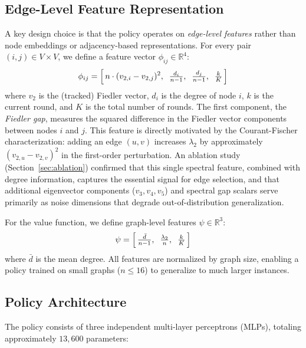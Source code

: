 \documentclass{article}
\begin{document}
\subsection{Edge-Level Feature Representation}

A key design choice is that the policy operates on \emph{edge-level features} rather than node embeddings or adjacency-based representations. For every pair $(i, j) \in V \times V$, we define a feature vector $\phi_{ij} \in \mathbb{R}^4$:
\begin{equation}\label{eq:features}
    \phi_{ij} = \Bigl[\, n \cdot (v_{2,i} - v_{2,j})^2, \;\; \tfrac{d_i}{n-1}, \;\; \tfrac{d_j}{n-1}, \;\; \tfrac{k}{K} \,\Bigr]
\end{equation}
where $v_2$ is the (tracked) Fiedler vector, $d_i$ is the degree of node $i$, $k$ is the current round, and $K$ is the total number of rounds. The first component, the \emph{Fiedler gap}, measures the squared difference in the Fiedler vector components between nodes $i$ and $j$. This feature is directly motivated by the Courant-Fischer characterization: adding an edge $(u,v)$ increases $\lambda_2$ by approximately $(v_{2,u} - v_{2,v})^2$ in the first-order perturbation. An ablation study (Section~\ref{sec:ablation}) confirmed that this single spectral feature, combined with degree information, captures the essential signal for edge selection, and that additional eigenvector components ($v_3, v_4, v_5$) and spectral gap scalars serve primarily as noise dimensions that degrade out-of-distribution generalization.

For the value function, we define graph-level features $\psi \in \mathbb{R}^3$:
\begin{equation}\label{eq:graph_features}
    \psi = \Bigl[\, \tfrac{\bar{d}}{n-1}, \;\; \tfrac{\lambda_2}{n}, \;\; \tfrac{k}{K} \,\Bigr]
\end{equation}
where $\bar{d}$ is the mean degree. All features are normalized by graph size, enabling a policy trained on small graphs ($n \leq 16$) to generalize to much larger instances.

\subsection{Policy Architecture}

The policy consists of three independent multi-layer perceptrons (MLPs), totaling approximately $13{,}600$ parameters:
\end{document}
